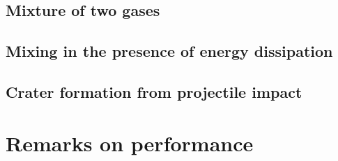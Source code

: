 \subsection{Mixture of two gases}

\subsection{Mixing in the presence of energy dissipation}

\subsection{Crater formation from projectile impact}

\section{Remarks on performance}




